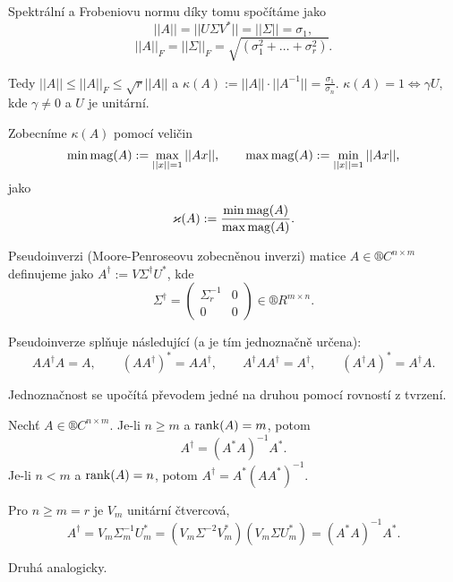 \documentclass[12pt]{article}					%
\begin{document}
\begin{poznamka}
	Spektrální a Frobeniovu normu díky tomu spočítáme jako
	$$ ||A|| = ||U\Sigma V^*|| = ||\Sigma|| = \sigma_1, $$
	$$ ||A||_F = ||\Sigma||_F = \sqrt{(\sigma_1^2 + … + \sigma_r^2)}. $$

	Tedy $||A|| ≤ ||A||_F ≤ \sqrt{r}||A||$ a $\kappa(A) := ||A||·||A^{-1}|| = \frac{\sigma_1}{\sigma_n}$. $\kappa(A) = 1 \Leftrightarrow \gamma U$, kde $\gamma ≠ 0$ a $U$ je unitární.
\end{poznamka}

\begin{definice}
	Zobecníme $\kappa(A)$ pomocí veličin
	$$ \operatorname{min\,mag}(A) := \max_{||x|| = 1}||Ax||, \qquad \operatorname{max\,mag}(A) := \min_{||x||=1}||Ax||, $$
	jako
	$$ \varkappa(A) := \frac{\operatorname{min\,mag}(A)}{\operatorname{max\,mag}(A)}. $$
\end{definice}

\begin{definice}[Pseudoinverze]
	Pseudoinverzi (Moore-Penroseovu zobecněnou inverzi) matice $A \in ®C^{n \times m}$ definujeme jako
	$A^\dagger := V \Sigma^\dagger U^*$, kde
	$$ \Sigma^\dagger = \begin{pmatrix} \Sigma_r^{-1} & 0 \\ 0 & 0 \end{pmatrix} \in ®R^{m \times n}. $$
\end{definice}

\begin{tvrzeni}
	Pseudoinverze splňuje následující (a je tím jednoznačně určena):
	$$ A A^\dagger A = A, \qquad (A A^\dagger)^* = A A^\dagger, \qquad A^\dagger A A^\dagger = A^\dagger, \qquad (A^\dagger A)^* = A^\dagger A. $$

	\begin{dukazin}
		Jednoznačnost se upočítá převodem jedné na druhou pomocí rovností z tvrzení.
	\end{dukazin}
\end{tvrzeni}

\begin{lemma}
	 Nechť $A \in ®C^{n \times m}$. Je-li $n ≥ m$ a $\operatorname{rank}(A) = m$, potom
	 $$ A^\dagger = (A^* A)^{-1} A^*. $$
	 Je-li $n < m$ a $\operatorname{rank}(A) = n$, potom $A^\dagger = A^*(A A^*)^{-1}$.

	 \begin{dukazin}
	 	Pro $n ≥ m = r$ je $V_m$ unitární čtvercová,
		$$ A^\dagger = V_m \Sigma_m^{-1} U_m^* = (V_m\Sigma^{-2}V_m^*)(V_m \Sigma U_m^*) = (A^* A)^{-1} A^*. $$

		Druhá analogicky.
	 \end{dukazin}
\end{lemma}
\end{document}
